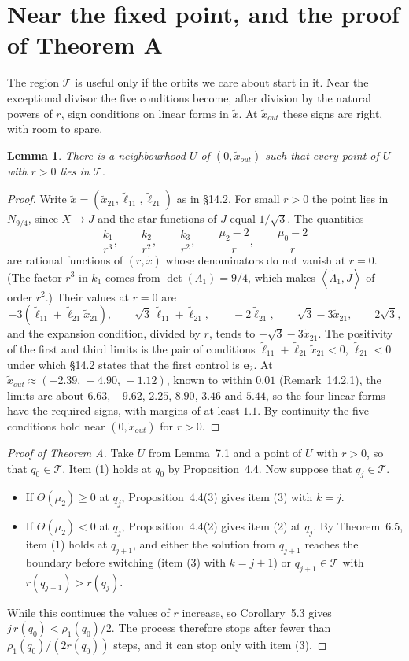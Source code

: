\documentclass[11pt,a4paper]{article}
\theoremstyle{plain}
\newtheorem{lemma}[theorem]{Lemma}
\theoremstyle{definition}
\theoremstyle{remark}
\newcommand{\bracks}[2]{\left\langle #1,#2\right\rangle}
\newcommand{\ep}{\mathbf{e}}
\newcommand{\T}{\mathcal{T}}
\begin{document}
\section{Near the fixed point, and the proof of Theorem A}

The region $\T$ is useful only if the orbits we care about start in it. Near the exceptional
divisor the five conditions become, after division by the natural powers of $r$, sign conditions
on linear forms in $\tilde x$. At $\tilde x_{out}$ these signs are right, with room to spare.

\begin{lemma}
There is a neighbourhood $U$ of $(0,\tilde x_{out})$ such that every point of $U$ with $r>0$ lies
in $\T$.
\end{lemma}

\begin{proof}
Write $\tilde x=(\tilde x_{21},\tilde\ell_{11},\tilde\ell_{21})$ as in \S14.2. For small $r>0$ the
point lies in $N_{9/4}$, since $X\to J$ and the star functions of $J$ equal $1/\sqrt3$. The
quantities
\[
\frac{k_1}{r^3},\qquad \frac{k_2}{r^2},\qquad \frac{k_3}{r^2},\qquad \frac{\mu_2-2}{r},\qquad
\frac{\mu_0-2}{r}
\]
are rational functions of $(r,\tilde x)$ whose denominators do not vanish at $r=0$. (The factor
$r^3$ in $k_1$ comes from $\det(\Lambda_1)=9/4$, which makes $\bracks{\tilde\Lambda_1}J$ of order
$r^2$.) Their values at $r=0$ are
\[
-3(\tilde\ell_{11}+\tilde\ell_{21}\tilde x_{21}),\qquad
\sqrt3\,\tilde\ell_{11}+\tilde\ell_{21},\qquad
-2\tilde\ell_{21},\qquad
\sqrt3-3\tilde x_{21},\qquad 2\sqrt3,
\]
and the expansion condition, divided by $r$, tends to $-\sqrt3-3\tilde x_{21}$. The positivity of
the first and third limits is the pair of conditions $\tilde\ell_{11}+\tilde\ell_{21}\tilde x_{21}<0$,
$\tilde\ell_{21}<0$ under which \S14.2 states that the first control is $\ep_2$. At
$\tilde x_{out}\approx(-2.39,\,-4.90,\,-1.12)$, known to within $0.01$ (Remark~14.2.1), the limits
are about $6.63$, $-9.62$, $2.25$, $8.90$, $3.46$ and $5.44$, so the four linear forms have the
required signs, with margins of at least $1.1$. By continuity the five conditions hold near
$(0,\tilde x_{out})$ for $r>0$.
\end{proof}

\begin{proof}[Proof of Theorem A]
Take $U$ from Lemma~7.1 and a point of $U$ with $r>0$, so that $q_0\in\T$. Item (1) holds at
$q_0$ by Proposition~4.4. Now suppose that $q_j\in\T$.
\begin{itemize}[itemsep=1pt]
\item If $\Theta(\mu_2)\ge0$ at $q_j$, Proposition~4.4(3) gives item (3) with $k=j$.
\item If $\Theta(\mu_2)<0$ at $q_j$, Proposition~4.4(2) gives item (2) at $q_j$. By Theorem~6.5,
item (1) holds at $q_{j+1}$, and either the solution from $q_{j+1}$ reaches the boundary before
switching (item (3) with $k=j+1$) or $q_{j+1}\in\T$ with $r(q_{j+1})>r(q_j)$.
\end{itemize}
While this continues the values of $r$ increase, so Corollary~5.3 gives
$j\,r(q_0)<\rho_1(q_0)/2$. The process therefore stops after fewer than $\rho_1(q_0)/(2r(q_0))$
steps, and it can stop only with item (3).
\end{proof}
\end{document}
